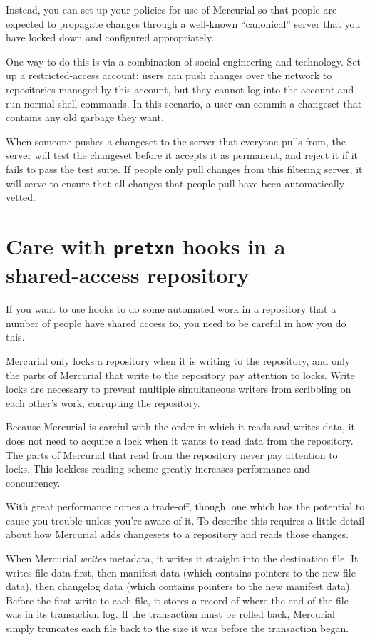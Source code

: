 Instead, you can set up your policies for use of Mercurial so that
people are expected to propagate changes through a well-known
``canonical'' server that you have locked down and configured
appropriately.

One way to do this is via a combination of social engineering and
technology.  Set up a restricted-access account; users can push
changes over the network to repositories managed by this account, but
they cannot log into the account and run normal shell commands.  In
this scenario, a user can commit a changeset that contains any old
garbage they want.

When someone pushes a changeset to the server that everyone pulls
from, the server will test the changeset before it accepts it as
permanent, and reject it if it fails to pass the test suite.  If
people only pull changes from this filtering server, it will serve to
ensure that all changes that people pull have been automatically
vetted.

\section{Care with \texttt{pretxn} hooks in a shared-access repository}

If you want to use hooks to do some automated work in a repository
that a number of people have shared access to, you need to be careful
in how you do this.

Mercurial only locks a repository when it is writing to the
repository, and only the parts of Mercurial that write to the
repository pay attention to locks.  Write locks are necessary to
prevent multiple simultaneous writers from scribbling on each other's
work, corrupting the repository.

Because Mercurial is careful with the order in which it reads and
writes data, it does not need to acquire a lock when it wants to read
data from the repository.  The parts of Mercurial that read from the
repository never pay attention to locks.  This lockless reading scheme
greatly increases performance and concurrency.

With great performance comes a trade-off, though, one which has the
potential to cause you trouble unless you're aware of it.  To describe
this requires a little detail about how Mercurial adds changesets to a
repository and reads those changes.

When Mercurial \emph{writes} metadata, it writes it straight into the
destination file.  It writes file data first, then manifest data
(which contains pointers to the new file data), then changelog data
(which contains pointers to the new manifest data).  Before the first
write to each file, it stores a record of where the end of the file
was in its transaction log.  If the transaction must be rolled back,
Mercurial simply truncates each file back to the size it was before the
transaction began.

